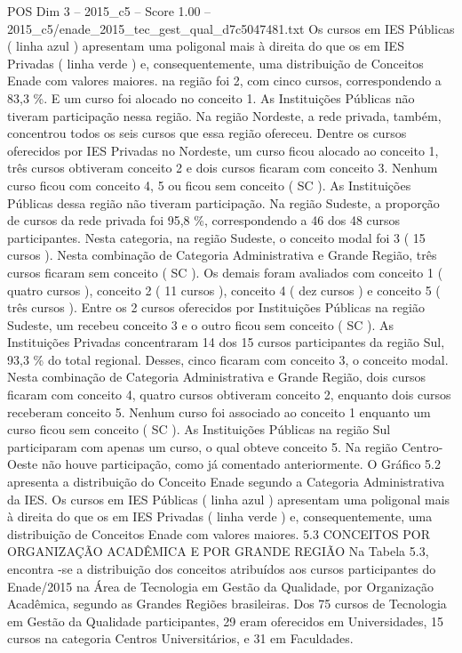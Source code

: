 \begin{textsample}{POS Dim 3 – 2015\_c5 – Score 1.00 – 2015\_c5/enade\_2015\_tec\_gest\_qual\_d7c5047481.txt}
Os cursos em IES Públicas ( linha azul ) apresentam uma poligonal mais à direita do que os em IES Privadas ( linha verde ) e, consequentemente, uma distribuição de Conceitos Enade com valores maiores. na região foi 2, com cinco cursos, correspondendo a 83,3 \%.
E um curso foi alocado no conceito 1.
As Instituições Públicas não tiveram participação nessa região.
Na região Nordeste, a rede privada, também, concentrou todos os seis cursos que essa região ofereceu.
Dentre os cursos oferecidos por IES Privadas no Nordeste, um curso ficou alocado ao conceito 1, três cursos obtiveram conceito 2 e dois cursos ficaram com conceito 3.
Nenhum curso ficou com conceito 4, 5 ou ficou sem conceito ( SC ).
As Instituições Públicas dessa região não tiveram participação.
Na região Sudeste, a proporção de cursos da rede privada foi 95,8 \%, correspondendo a 46 dos 48 cursos participantes.
Nesta categoria, na região Sudeste, o conceito modal foi 3 ( 15 cursos ).
Nesta combinação de Categoria Administrativa e Grande Região, três cursos ficaram sem conceito ( SC ).
Os demais foram avaliados com conceito 1 ( quatro cursos ), conceito 2 ( 11 cursos ), conceito 4 ( dez cursos ) e conceito 5 ( três cursos ).
Entre os 2 cursos oferecidos por Instituições Públicas na região Sudeste, um recebeu conceito 3 e o outro ficou sem conceito ( SC ).
As Instituições Privadas concentraram 14 dos 15 cursos participantes da região Sul, 93,3 \% do total regional.
Desses, cinco ficaram com conceito 3, o conceito modal.
Nesta combinação de Categoria Administrativa e Grande Região, dois cursos ficaram com conceito 4, quatro cursos obtiveram conceito 2, enquanto dois cursos receberam conceito 5.
Nenhum curso foi associado ao conceito 1 enquanto um curso ficou sem conceito ( SC ).
As Instituições Públicas na região Sul participaram com apenas um curso, o qual obteve conceito 5.
Na região Centro-Oeste não houve participação, como já comentado anteriormente.
O Gráfico 5.2 apresenta a distribuição do Conceito Enade segundo a Categoria Administrativa da IES.
Os cursos em IES Públicas ( linha azul ) apresentam uma poligonal mais à direita do que os em IES Privadas ( linha verde ) e, consequentemente, uma distribuição de Conceitos Enade com valores maiores. 5.3 CONCEITOS POR ORGANIZAÇÃO ACADÊMICA E POR GRANDE REGIÃO Na Tabela 5.3, encontra -se a distribuição dos conceitos atribuídos aos cursos participantes do Enade/2015 na Área de Tecnologia em Gestão da Qualidade, por Organização Acadêmica, segundo as Grandes Regiões brasileiras.
Dos 75 cursos de Tecnologia em Gestão da Qualidade participantes, 29 eram oferecidos em Universidades, 15 cursos na categoria Centros Universitários, e 31 em Faculdades.

\end{textsample}
